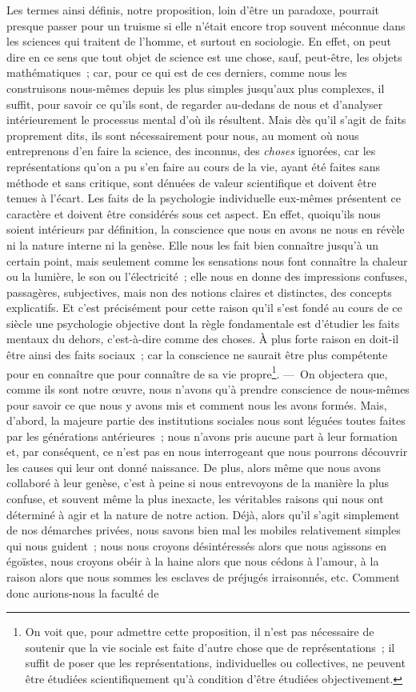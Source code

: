 \documentclass[french,twoside]{book} %
\begin{document}
Les termes ainsi définis, notre proposition, loin d’être un paradoxe, pourrait presque passer pour un truisme si elle n’était encore trop souvent méconnue dans les sciences qui traitent de l’homme, et surtout en sociologie. En effet, on peut dire en ce sens que tout objet de science est une chose, sauf, peut-être, les objets mathématiques ; car, pour ce qui est de ces derniers, comme nous les construisons nous-mêmes depuis les plus simples jusqu’aux plus complexes, il suffit, pour savoir ce qu’ils sont, de regarder au-dedans de nous et d’analyser intérieurement le processus mental d’où ils résultent. Mais dès qu’il s’agit de faits proprement dits, ils sont nécessairement pour nous, au moment où nous entreprenons d’en faire la science, des inconnus, des {\itshape choses} ignorées, car les représentations qu’on a pu s’en faire au cours de la vie, ayant été faites sans méthode et sans critique, sont dénuées de valeur scientifique et doivent être tenues à l’écart. Les faits de la psychologie individuelle eux-mêmes présentent ce caractère et doivent être considérés sous cet aspect. En effet, quoiqu’ils nous soient intérieurs par définition, la conscience que nous en avons ne nous en révèle ni la nature interne ni la genèse. Elle nous les fait bien connaître jusqu’à un certain point, mais seulement comme les sensations nous font connaître la chaleur ou la lumière, le son ou l’électricité ; elle nous en donne des impressions confuses, passagères, subjectives, mais non des notions claires et distinctes, des concepts explicatifs. Et c’est précisément pour cette raison qu’il s’est fondé au cours de ce siècle une psychologie objective dont la règle fondamentale est d’étudier les faits mentaux du dehors, c’est-à-dire comme des choses. À plus forte raison en doit-il être ainsi des faits sociaux ; car la conscience ne saurait être plus compétente pour en connaître que pour connaître de sa vie propre\footnote{ On voit que, pour admettre cette proposition, il n’est pas nécessaire de soutenir que la vie sociale est faite d’autre chose que de représentations ; il suffit de poser que les représentations, individuelles ou collectives, ne peuvent être étudiées scientifiquement qu’à condition d’être étudiées objectivement.}. — On objectera que, comme ils sont notre œuvre, nous n’avons qu’à prendre conscience de nous-mêmes pour savoir ce que nous y avons mis et comment nous les avons formés. Mais, d’abord, la majeure partie des institutions sociales nous sont léguées toutes faites par les générations antérieures ; nous n’avons pris aucune part à leur formation et, par conséquent, ce n’est pas en nous interrogeant que nous pourrons découvrir les causes qui leur ont donné naissance. De plus, alors même que nous avons collaboré à leur genèse, c’est à peine si nous entrevoyons de la manière la plus confuse, et souvent même la plus inexacte, les véritables raisons qui nous ont déterminé à agir et la nature de notre action. Déjà, alors qu’il s’agit simplement de nos démarches privées, nous savons bien mal les mobiles relativement simples qui nous guident ; nous nous croyons désintéressés alors que nous agissons en égoïstes, nous croyons obéir à la haine alors que nous cédons à l’amour, à la raison alors que nous sommes les esclaves de préjugés irraisonnés, etc. Comment donc aurions-nous la faculté de 
\end{document}
